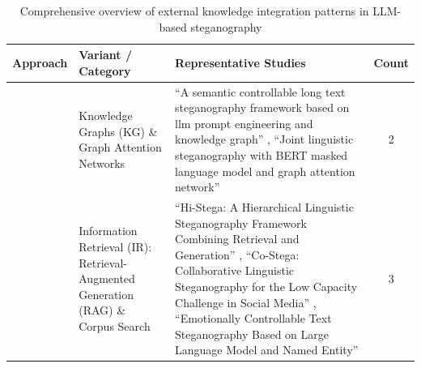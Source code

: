 \begin{table}[t]
  \centering
  \small
  \caption{Comprehensive overview of external knowledge integration patterns in LLM-based steganography}
  \label{tab:knowledge_integration_comprehensive}
  \begin{tabular}{|>{\raggedright\arraybackslash}p{2cm}|>{\raggedright\arraybackslash}p{2cm}|>{\raggedright\arraybackslash}p{7cm}|c|}
    \hline
    \textbf{Approach}                                   & \textbf{Variant / Category}                                                       & \textbf{Representative Studies}                                                                                                                                                                                                                                                                                                                                                                                                                                                                                                                                                                                                                                                                                                                                                           & \textbf{Count} \\
    \hline
    \multirow{2}{2cm}{Structured Knowledge Integration} & Knowledge Graphs (KG) \& Graph Attention Networks                                 & ``A semantic controllable long text steganography framework based on llm prompt engineering and knowledge graph'' \cite{li2024semantic}, ``Joint linguistic steganography with BERT masked language model and graph attention network'' \cite{ding2023joint}                                                                                                                                                                                                                                                                                                                                                                                                                                                                                                                              & 2              \\
    \cline{2-4}
                                                        & Information Retrieval (IR): Retrieval-Augmented Generation (RAG) \& Corpus Search & ``Hi-Stega: A Hierarchical Linguistic Steganography Framework Combining Retrieval and Generation'' \cite{wang2023hi}, ``Co-Stega: Collaborative Linguistic Steganography for the Low Capacity Challenge in Social Media'' \cite{liao2024co}, ``Emotionally Controllable Text Steganography Based on Large Language Model and Named Entity'' \cite{shi2025emotionally}                                                                                                                                                                                                                                                                                                                                                                                                                     & 3              \\

\end{tabular}
\end{table}
